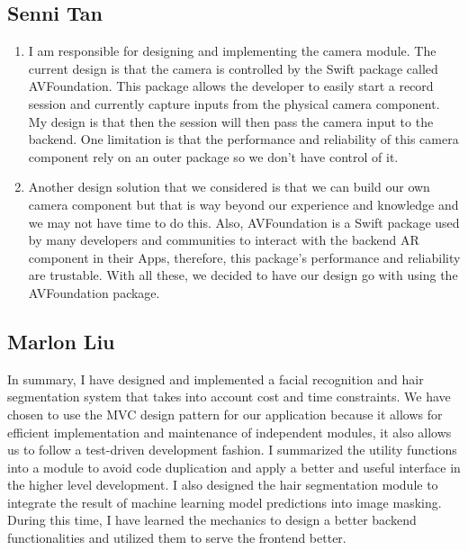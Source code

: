 \documentclass[12pt, titlepage]{article}
\begin{document}
\subsection{Senni Tan}
\begin{enumerate}
    \item I am responsible for designing and implementing the camera module. The current design is that the camera is controlled by the Swift package called AVFoundation. This package allows the developer to easily start a record session and currently capture inputs from the physical camera component. My design is that then the session will then pass the camera input to the backend. One limitation is that the performance and reliability of this camera component rely on an outer package so we don't have control of it.
    \item Another design solution that we considered is that we can build our own camera component but that is way beyond our experience and knowledge and we may not have time to do this. Also, AVFoundation is a Swift package used by many developers and communities to interact with the backend AR component in their Apps, therefore, this package's performance and reliability are trustable. With all these, we decided to have our design go with using the AVFoundation package.
\end{enumerate}

\subsection{Marlon Liu}
\begin{enumerate}
In summary, I have designed and implemented a facial recognition and hair segmentation system that takes into account cost and time constraints. We have chosen to use the MVC design pattern for our application because it allows for efficient implementation and maintenance of independent modules, it also allows us to follow a test-driven development fashion. I summarized the utility functions into a module to avoid code duplication and apply a better and useful interface in the higher level development. I also designed the hair segmentation module to integrate the result of machine learning model predictions into image masking. During this time, I have learned the mechanics to design a better backend functionalities and utilized them to serve the frontend better. 
\end{enumerate}
\end{document}
